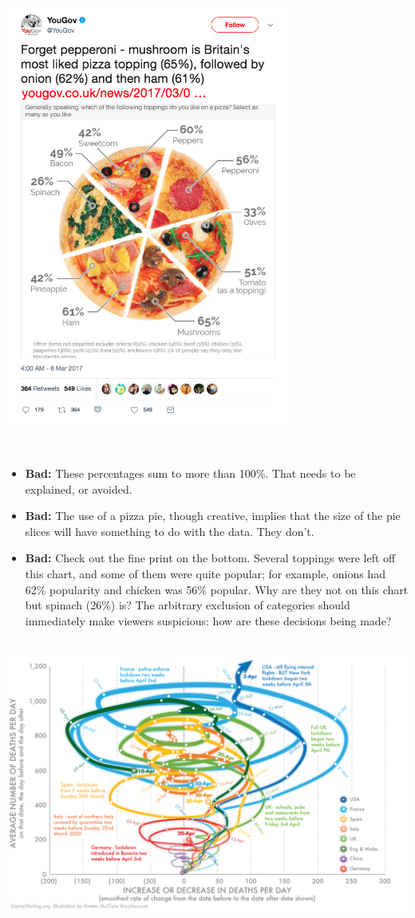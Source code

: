 \documentclass[
]{book}
\providecommand{\tightlist}{%
  \setlength{\itemsep}{0pt}\setlength{\parskip}{0pt}}
\begin{document}
\includegraphics[width=0.7\textwidth,height=\textheight]{img/vis9.png}

~

\begin{itemize}
\tightlist
\item
  \textbf{Bad:} These percentages sum to more than 100\%. That needs to be explained, or avoided.\\
\item
  \textbf{Bad:} The use of a pizza pie, though creative, implies that the size of the pie slices will have something to do with the data. They don't.
\item
  \textbf{Bad:} Check out the fine print on the bottom. Several toppings were left off this chart, and some of them were quite popular; for example, onions had 62\% popularity and chicken was 56\% popular. Why are they not on this chart but spinach (26\%) is? The arbitrary exclusion of categories should immediately make viewers suspicious: how are these decisions being made?
\end{itemize}

~\\

\includegraphics{img/vis10.png}
\end{document}
